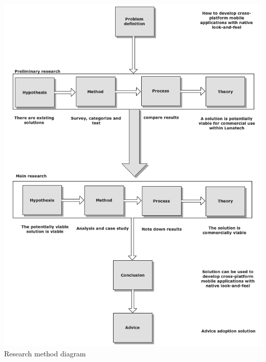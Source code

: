 \newpage
\begin{centering}
\includegraphics[scale=0.6]{images/researchprocess.png}\\{Research method diagram}\\
\end{centering}


